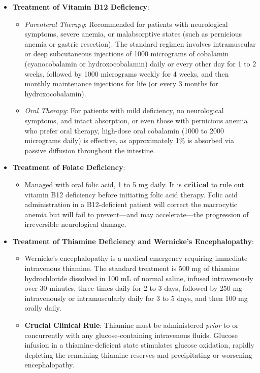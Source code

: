 \begin{itemize}
    \item \textbf{Treatment of Vitamin B12 Deficiency}:
    \begin{itemize}
        \item \textit{Parenteral Therapy}: Recommended for patients with neurological symptoms, severe anemia, or malabsorptive states (such as pernicious anemia or gastric resection). The standard regimen involves intramuscular or deep subcutaneous injections of 1000 micrograms of cobalamin (cyanocobalamin or hydroxocobalamin) daily or every other day for 1 to 2 weeks, followed by 1000 micrograms weekly for 4 weeks, and then monthly maintenance injections for life (or every 3 months for hydroxocobalamin).
        \item \textit{Oral Therapy}: For patients with mild deficiency, no neurological symptoms, and intact absorption, or even those with pernicious anemia who prefer oral therapy, high-dose oral cobalamin (1000 to 2000 micrograms daily) is effective, as approximately 1\% is absorbed via passive diffusion throughout the intestine.
    \end{itemize}
    \item \textbf{Treatment of Folate Deficiency}:
    \begin{itemize}
        \item Managed with oral folic acid, 1 to 5 mg daily. It is \textbf{critical} to rule out vitamin B12 deficiency before initiating folic acid therapy. Folic acid administration in a B12-deficient patient will correct the macrocytic anemia but will fail to prevent---and may accelerate---the progression of irreversible neurological damage.
    \end{itemize}
    \item \textbf{Treatment of Thiamine Deficiency and Wernicke's Encephalopathy}:
    \begin{itemize}
        \item Wernicke's encephalopathy is a medical emergency requiring immediate intravenous thiamine. The standard treatment is 500 mg of thiamine hydrochloride dissolved in 100 mL of normal saline, infused intravenously over 30 minutes, three times daily for 2 to 3 days, followed by 250 mg intravenously or intramuscularly daily for 3 to 5 days, and then 100 mg orally daily.
        \item \textbf{Crucial Clinical Rule}: Thiamine must be administered \textit{prior} to or concurrently with any glucose-containing intravenous fluids. Glucose infusion in a thiamine-deficient state stimulates glucose oxidation, rapidly depleting the remaining thiamine reserves and precipitating or worsening encephalopathy.

\end{itemize}
\end{itemize}
